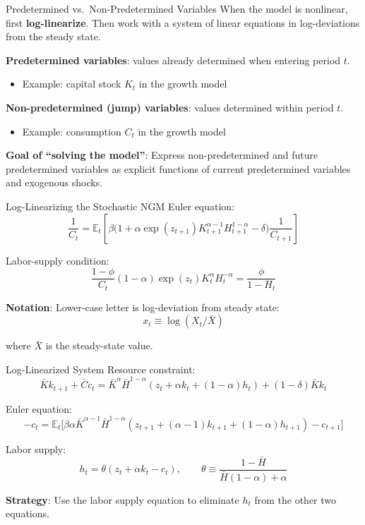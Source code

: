 \documentclass[blue]{beamer}
\newcommand{\E}{\mathbb{E}}
\begin{document}
\begin{frame}{Predetermined vs.\ Non-Predetermined Variables}
	When the model is nonlinear, first \textbf{log-linearize}. Then work with a system of linear equations in log-deviations from the steady state.
	
	\bigskip
	\textbf{Predetermined variables}: values already determined when entering period $t$.
	\begin{itemize}
		\item Example: capital stock $K_t$ in the growth model
	\end{itemize}
	
	\bigskip
	\textbf{Non-predetermined (jump) variables}: values determined within period $t$.
	\begin{itemize}
		\item Example: consumption $C_t$ in the growth model
	\end{itemize}
	
	\bigskip
	\textbf{Goal of ``solving the model''}: Express non-predetermined and future predetermined variables as explicit functions of current predetermined variables and exogenous shocks.
\end{frame}



\begin{frame}{Log-Linearizing the Stochastic NGM}
	Euler equation:
	\[
	\frac{1}{C_t} = \E_t\!\left[\beta\bigl(1 + \alpha \exp(z_{t+1}) K_{t+1}^{\alpha-1} H_{t+1}^{1-\alpha} - \delta\bigr) \frac{1}{C_{t+1}}\right]
	\]
	
	\bigskip
	Labor-supply condition:
	\[
	\frac{1-\phi}{C_t}(1-\alpha) \exp(z_t) K_t^\alpha H_t^{-\alpha} = \frac{\phi}{1 - H_t}
	\]
	
	\bigskip
	\textbf{Notation}: Lower-case letter is log-deviation from steady state:
	\[
	x_t \equiv \log(X_t / \bar{X})
	\]
	
	where $\bar{X}$ is the steady-state value.
\end{frame}

\begin{frame}{Log-Linearized System}
	\small
	Resource constraint:
	\[
	\bar{K} k_{t+1} + \bar{C} c_t = \bar{K}^\alpha \bar{H}^{1-\alpha}(z_t + \alpha k_t + (1-\alpha) h_t) + (1-\delta) \bar{K} k_t
	\]
	
	\bigskip
	Euler equation:
	\[
	-c_t = \E_t\!\bigl[\beta \alpha \bar{K}^{\alpha-1} \bar{H}^{1-\alpha}(z_{t+1} + (\alpha-1) k_{t+1} + (1-\alpha) h_{t+1}) - c_{t+1}\bigr]
	\]
	
	\bigskip
	Labor supply:
	\[
	h_t = \theta(z_t + \alpha k_t - c_t), \qquad \theta \equiv \frac{1 - \bar{H}}{\bar{H}(1 - \alpha) + \alpha}
	\]
	
	\bigskip
	\textbf{Strategy}: Use the labor supply equation to eliminate $h_t$ from the other two equations.
\end{frame}
\end{document}
